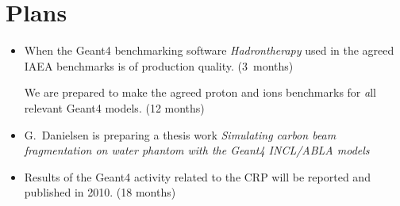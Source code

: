 \documentclass[twoside,floatfix,a4wide]{d}
\numberwithin{equation}{section} %
\begin{document}
\section{Plans}
\vspace{-0.4cm}
\begin{itemize}
\item  When the Geant4 benchmarking software {\em Hadrontherapy} used in 
the agreed IAEA benchmarks is of production quality. (3~months)
\begin{itemize}
We are prepared to make the agreed proton and ions 
benchmarks for {\emph all} relevant Geant4 models. (12 months)

\end{itemize}
\item G.~Danielsen is preparing a thesis work 
{\em Simulating carbon beam fragmentation on water phantom with the Geant4 INCL/ABLA models}
\item Results of the Geant4 activity related to the CRP will be reported and published in 2010. (18 months)
\end{itemize}
\end{document}
